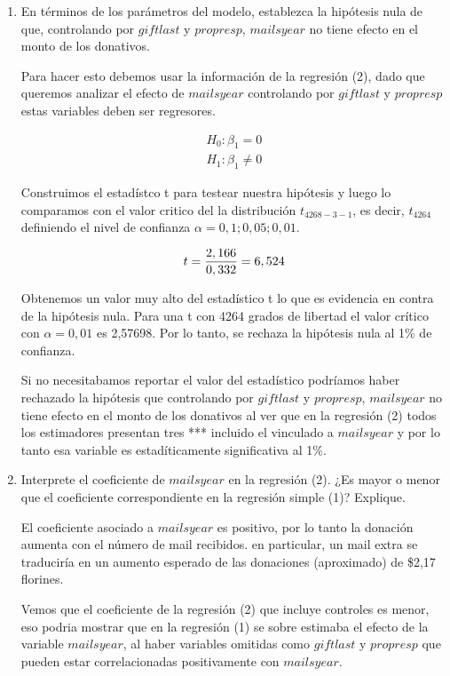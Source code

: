 \documentclass[10pt,a4paper]{article}
\begin{document}
\begin{enumerate}


    \item En términos de los parámetros del modelo, establezca la hipótesis nula de que, controlando por
$giftlast$ y $propresp$, $mailsyear$ no tiene efecto en el monto de los donativos. 
    
   {\color{blue} Para hacer esto debemos usar la información de la regresión (2), dado que queremos analizar el efecto de $mailsyear$ controlando por $giftlast$ y $propresp$ estas variables deben ser regresores.  
   
   \begin{eqnarray*}
       H_0: \beta_1=0\\
              H_1: \beta_1\neq 0
   \end{eqnarray*}

   Construimos el estadístco t para testear nuestra hipótesis y luego lo comparamos con el valor critico del la distribución $t_{4268-3-1}$, es decir, $ t_{4264}$ definiendo el nivel de confianza $\alpha=0,1;0,05; 0,01.$     


\begin{eqnarray*}
    t={2,166\over 0,332}=6,524
\end{eqnarray*}

 Obtenemos un valor muy alto del estadístico t lo que es evidencia en contra de la hipótesis nula. Para una t con 4264 grados de libertad   el valor crítico con $\alpha =0,01$ es 2,57698. Por lo tanto, se rechaza la hipótesis nula al 1\% de confianza. 
 
 Si no necesitabamos reportar  el valor del estadístico podríamos 
haber rechazado la hipótesis que  controlando por
$giftlast$ y $propresp$, $mailsyear$ no tiene efecto en el monto de los donativos al ver que en la regresión (2) todos los estimadores presentan tres *** incluido el vinculado a   $mailsyear$ y por lo tanto esa variable es estadíticamente significativa al 1\%.  } 

\item Interprete el coeficiente de $mailsyear$ en la regresión (2). ¿Es mayor o menor que el coeficiente correspondiente
en la regresión simple (1)? Explique.

{\color{blue} El coeficiente asociado a $mailsyear$ es positivo, por lo tanto la donación aumenta con el número de mail recibidos. en particular, un mail extra se traduciría en un aumento esperado de las donaciones (aproximado) de \$2,17 florines.

Vemos que el coeficiente de la regresión (2) que incluye controles es menor, eso podria mostrar que en la regresión (1) se sobre estimaba el efecto de la variable $mailsyear$, al haber variables omitidas como $giftlast$ y $propresp$ que pueden estar correlacionadas positivamente con $mailsyear$.  }  


\end{enumerate}
\end{document}
